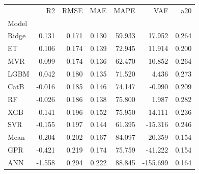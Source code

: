\begin{tabular}{lrrrrrr}
\toprule
 & R2 & RMSE & MAE & MAPE & VAF & a20 \\
Model &  &  &  &  &  &  \\
\midrule
Ridge & 0.131 & 0.171 & 0.130 & 59.933 & 17.952 & 0.264 \\
ET & 0.106 & 0.174 & 0.139 & 72.945 & 11.914 & 0.200 \\
MVR & 0.099 & 0.174 & 0.136 & 62.470 & 10.852 & 0.264 \\
LGBM & 0.042 & 0.180 & 0.135 & 71.520 & 4.436 & 0.273 \\
CatB & -0.016 & 0.185 & 0.146 & 74.147 & -0.990 & 0.209 \\
RF & -0.026 & 0.186 & 0.138 & 75.800 & 1.987 & 0.282 \\
XGB & -0.141 & 0.196 & 0.152 & 75.950 & -14.111 & 0.236 \\
SVR & -0.155 & 0.197 & 0.144 & 61.395 & -15.316 & 0.246 \\
Mean & -0.204 & 0.202 & 0.167 & 84.097 & -20.359 & 0.154 \\
GPR & -0.421 & 0.219 & 0.174 & 75.759 & -41.222 & 0.154 \\
ANN & -1.558 & 0.294 & 0.222 & 88.845 & -155.699 & 0.164 \\
\bottomrule
\end{tabular}
